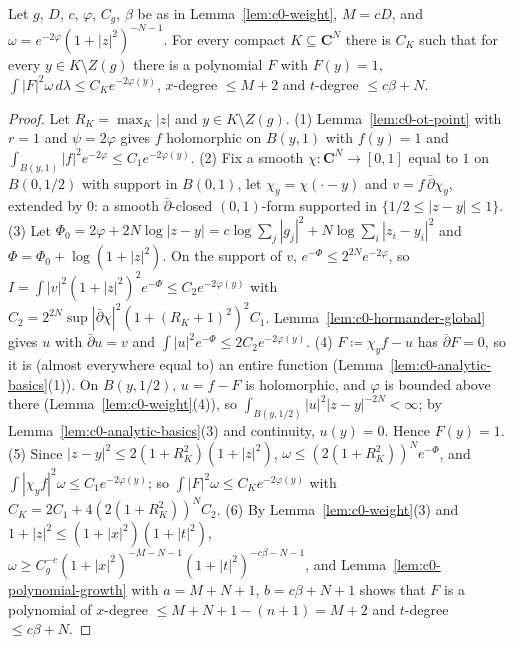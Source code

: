 \begin{proposition}\label{prop:c0-l2-extension}
\leanok
{}
Let $g$, $D$, $c$, $\varphi$, $C_g$, $\beta$ be as in Lemma~\ref{lem:c0-weight}, $M=cD$, and $\omega=e^{-2\varphi}(1+|z|^2)^{-N-1}$. For every compact
$K\subseteq\mathbf C^N$ there is $C_K$ such that for every $y\in K\setminus Z(g)$ there is a polynomial $F$ with $F(y)=1$,
$\int|F|^2\omega\,d\lambda\le C_Ke^{-2\varphi(y)}$, $x$-degree $\le M+2$ and $t$-degree $\le c\beta+N$.
\end{proposition}

\begin{proof}
Let $R_K=\max_K|z|$ and $y\in K\setminus Z(g)$. (1) Lemma~\ref{lem:c0-ot-point} with $r=1$ and $\psi=2\varphi$ gives $f$ holomorphic on $B(y,1)$ with
$f(y)=1$ and $\int_{B(y,1)}|f|^2e^{-2\varphi}\le C_1e^{-2\varphi(y)}$. (2) Fix a smooth $\chi\colon\mathbf C^N\to[0,1]$ equal to $1$ on $B(0,1/2)$ with
support in $B(0,1)$, let $\chi_y=\chi(\cdot-y)$ and $v=f\,\bar\partial\chi_y$, extended by $0$: a smooth $\bar\partial$-closed $(0,1)$-form supported in
$\{1/2\le|z-y|\le1\}$. (3) Let $\Phi_0=2\varphi+2N\log|z-y|=c\log\sum_j|g_j|^2+N\log\sum_i|z_i-y_i|^2$ and $\Phi=\Phi_0+\log(1+|z|^2)$. On the
support of $v$, $e^{-\Phi}\le2^{2N}e^{-2\varphi}$, so $I=\int|v|^2(1+|z|^2)^2e^{-\Phi}\le C_2e^{-2\varphi(y)}$ with
$C_2=2^{2N}\sup|\bar\partial\chi|^2(1+(R_K+1)^2)^2C_1$. Lemma~\ref{lem:c0-hormander-global} gives $u$ with $\bar\partial u=v$ and
$\int|u|^2e^{-\Phi}\le2C_2e^{-2\varphi(y)}$. (4) $F\coloneqq\chi_yf-u$ has $\bar\partial F=0$, so it is (almost everywhere equal to) an entire
function (Lemma~\ref{lem:c0-analytic-basics}(1)). On $B(y,1/2)$, $u=f-F$ is holomorphic, and $\varphi$ is bounded above there
(Lemma~\ref{lem:c0-weight}(4)), so $\int_{B(y,1/2)}|u|^2|z-y|^{-2N}<\infty$; by Lemma~\ref{lem:c0-analytic-basics}(3) and continuity, $u(y)=0$. Hence
$F(y)=1$. (5) Since $|z-y|^2\le2(1+R_K^2)(1+|z|^2)$, $\omega\le(2(1+R_K^2))^Ne^{-\Phi}$, and $\int|\chi_yf|^2\omega\le C_1e^{-2\varphi(y)}$; so
$\int|F|^2\omega\le C_Ke^{-2\varphi(y)}$ with $C_K=2C_1+4(2(1+R_K^2))^NC_2$. (6) By Lemma~\ref{lem:c0-weight}(3) and
$1+|z|^2\le(1+|x|^2)(1+|t|^2)$, $\omega\ge C_g^{-c}(1+|x|^2)^{-M-N-1}(1+|t|^2)^{-c\beta-N-1}$, and Lemma~\ref{lem:c0-polynomial-growth} with $a=M+N+1$,
$b=c\beta+N+1$ shows that $F$ is a polynomial of $x$-degree $\le M+N+1-(n+1)=M+2$ and $t$-degree $\le c\beta+N$.
\end{proof}

